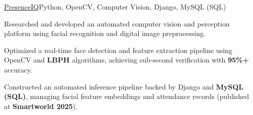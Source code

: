 \begin{cvproject}{\uline{PresenceIQ}}{Python, OpenCV, Computer Vision, Django, MySQL (SQL)}
    \item Researched and developed an automated computer vision and perception platform using facial recognition and digital image preprocessing.
    \item Optimized a real-time face detection and feature extraction pipeline using OpenCV and \textbf{LBPH} algorithms, achieving sub-second verification with \textbf{95\%+} accuracy.
    \item Constructed an automated inference pipeline backed by Django and \textbf{MySQL (SQL)}, managing facial feature embeddings and attendance records (published at \textbf{Smartworld 2025}).
\end{cvproject}
